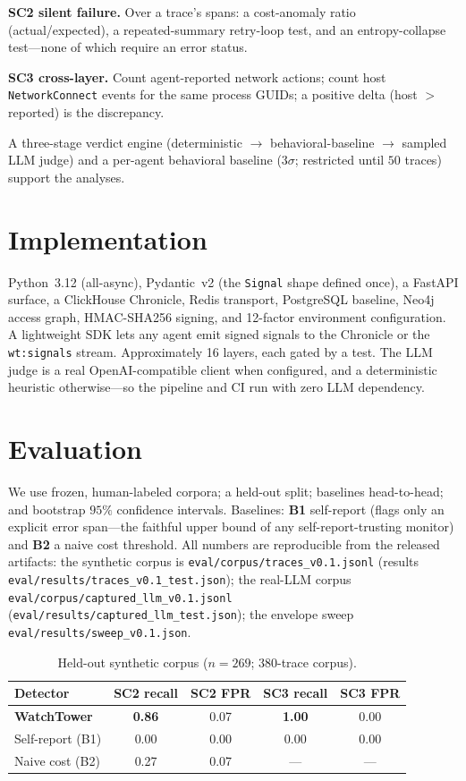 \documentclass[conference]{IEEEtran}
\begin{document}
\noindent\textbf{SC2 silent failure.} Over a trace's spans: a cost-anomaly ratio
(actual/expected), a repeated-summary retry-loop test, and an entropy-collapse test---none of
which require an error status.

\noindent\textbf{SC3 cross-layer.} Count agent-reported network actions; count host
\texttt{NetworkConnect} events for the same process GUIDs; a positive delta (host $>$ reported)
is the discrepancy.

A three-stage verdict engine (deterministic $\rightarrow$ behavioral-baseline $\rightarrow$
sampled LLM judge) and a per-agent behavioral baseline ($3\sigma$; restricted until $50$ traces)
support the analyses.

\section{Implementation}
Python~3.12 (all-async), Pydantic~v2 (the \texttt{Signal} shape defined once), a FastAPI
surface, a ClickHouse Chronicle, Redis transport, PostgreSQL baseline, Neo4j access graph,
HMAC-SHA256 signing, and 12-factor environment configuration. A lightweight SDK lets any agent
emit signed signals to the Chronicle or the \texttt{wt:signals} stream. Approximately 16 layers,
each gated by a test. The LLM judge is a real OpenAI-compatible client when configured, and a
deterministic heuristic otherwise---so the pipeline and CI run with zero LLM dependency.

\section{Evaluation}
We use frozen, human-labeled corpora; a held-out split; baselines head-to-head; and bootstrap
$95\%$ confidence intervals. Baselines: \textbf{B1} self-report (flags only an explicit error
span---the faithful upper bound of any self-report-trusting monitor) and \textbf{B2} a naive
cost threshold. All numbers are reproducible from the released artifacts: the synthetic corpus
is \texttt{eval/corpus/traces\_v0.1.jsonl} (results \texttt{eval/results/traces\_v0.1\_test.json});
the real-LLM corpus \texttt{eval/corpus/captured\_llm\_v0.1.jsonl}
(\texttt{eval/results/captured\_llm\_test.json}); the envelope sweep
\texttt{eval/results/sweep\_v0.1.json}.

\begin{table}[t]
\caption{Held-out synthetic corpus ($n{=}269$; 380-trace corpus).}
\label{tab:synth}
\centering\footnotesize
\begin{tabular}{lcccc}
\toprule
Detector & SC2 recall & SC2 FPR & SC3 recall & SC3 FPR \\
\midrule
\textbf{WatchTower} & \textbf{0.86} & 0.07 & \textbf{1.00} & 0.00 \\
Self-report (B1)    & 0.00 & 0.00 & 0.00 & 0.00 \\
Naive cost (B2)     & 0.27 & 0.07 & --- & --- \\
\bottomrule
\end{tabular}
\end{table}
\end{document}
